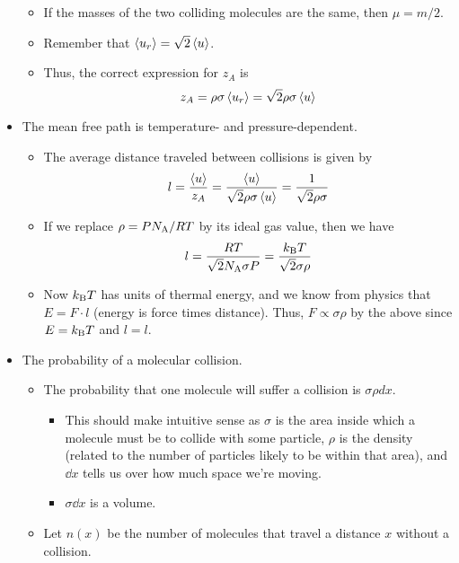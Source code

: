 \documentclass[../notes.tex]{subfiles}
\begin{document}
\begin{itemize}
\begin{itemize}
        \item If the masses of the two colliding molecules are the same, then $\mu=m/2$.
        \item Remember that $\left\langle{u_r}\right\rangle=\sqrt{2}\left\langle{u}\right\rangle$.
        \item Thus, the correct expression for $z_A$ is
        \begin{equation*}
            z_A = \rho\sigma\left\langle{u_r}\right\rangle
            = \sqrt{2}\rho\sigma\left\langle{u}\right\rangle
        \end{equation*}
    \end{itemize}
    \item The mean free path is temperature- and pressure-dependent.
    \begin{itemize}
        \item The average distance traveled between collisions is given by
        \begin{equation*}
            l = \frac{\left\langle{u}\right\rangle}{z_A}
            = \frac{\left\langle{u}\right\rangle}{\sqrt{2}\rho\sigma\left\langle{u}\right\rangle}
            = \frac{1}{\sqrt{2}\rho\sigma}
        \end{equation*}
        \item If we replace $\rho=PN_\text{A}/RT$ by its ideal gas value, then we have
        \begin{equation*}
            l = \frac{RT}{\sqrt{2}N_\text{A}\sigma P}
            = \frac{k_\text{B} T}{\sqrt{2}\sigma\rho}
        \end{equation*}
        \item Now $k_\text{B} T$ has units of thermal energy, and we know from physics that $E=F\cdot l$ (energy is force times distance). Thus, $F\propto\sigma\rho$ by the above since $E=k_\text{B} T$ and $l=l$.
    \end{itemize}
    \item The probability of a molecular collision.
    \begin{itemize}
        \item The probability that one molecule will suffer a collision is $\sigma\rho dx$.
        \begin{itemize}
            \item This should make intuitive sense as $\sigma$ is the area inside which a molecule must be to collide with some particle, $\rho$ is the density (related to the number of particles likely to be within that area), and $\dd{x}$ tells us over how much space we're moving.
            \item $\sigma\dd{x}$ is a volume.
        \end{itemize}
        \item Let $n(x)$ be the number of molecules that travel a distance $x$ without a collision.

\end{itemize}
\end{itemize}
\end{document}
